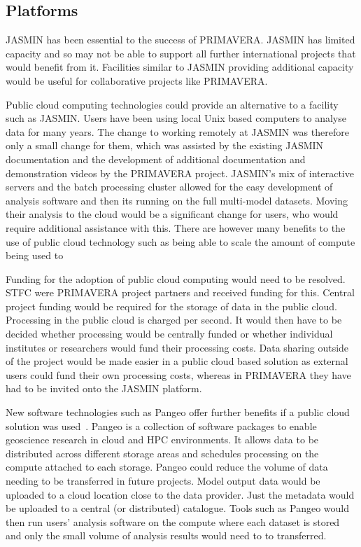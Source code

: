 \documentclass[gmd, manuscript]{copernicus}
\begin{document}
\subsection{Platforms}

JASMIN has been essential to the success of PRIMAVERA. JASMIN has limited capacity and so may not be able to support all further international projects that would benefit from it. Facilities similar to JASMIN providing additional capacity would be useful for collaborative projects like PRIMAVERA.

Public cloud computing technologies could provide an alternative to a facility such as JASMIN. Users have been using local Unix based computers to analyse data for many years. The change to working remotely at JASMIN was therefore only a small change for them, which was assisted by the existing JASMIN documentation and the development of additional documentation and demonstration videos by the PRIMAVERA project. JASMIN's mix of interactive servers and the batch processing cluster allowed for the easy development of analysis software and then its running on the full multi-model datasets. Moving their analysis to the cloud would be a significant change for users, who would require additional assistance with this. There are however many benefits to the use of public cloud technology such as being able to scale the amount of compute being used to 

Funding for the adoption of public cloud computing would need to be resolved. STFC were PRIMAVERA project partners and received funding for this. Central project funding would be required for the storage of data in the public cloud. Processing in the public cloud is charged per second. It would then have to be decided whether processing would be centrally funded or whether individual institutes or researchers would fund their processing costs. Data sharing outside of the project would be made easier in a public cloud based solution as external users could fund their own processing costs, whereas in PRIMAVERA they have had to be invited onto the JASMIN platform.

New software technologies such as Pangeo offer further benefits if a public cloud solution was used~\citep{Pangeo}. Pangeo is a collection of software packages to enable geoscience research in cloud and HPC environments. It allows data to be distributed across different storage areas and schedules processing on the compute attached to each storage. Pangeo could reduce the volume of data needing to be transferred in future projects. Model output data would be uploaded to a cloud location close to the data provider. Just the metadata would be uploaded to a central (or distributed) catalogue. Tools such as Pangeo would then run users' analysis software on the compute where each dataset is stored and only the small volume of analysis results would need to to transferred.
\end{document}
